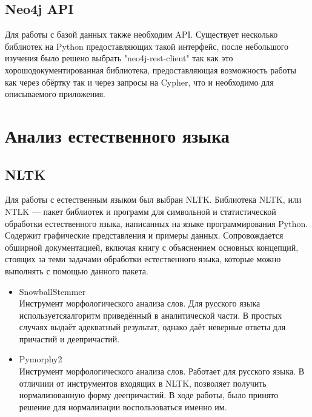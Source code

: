 \subsection {Neo4j API}
Для работы с базой данных также необходим API. Существует несколько библиотек на Python предоставляющих такой интерфейс, после небольшого изучения было решено выбрать "neo4j-rest-client" так как это хорошодокументированная библиотека, предоставляющая возможность работы как через обёртку так и через запросы на Cypher, что и необходимо для описываемого приложения.
\section{Анализ естественного языка}
\subsection{NLTK}
Для работы с естественным языком был выбран NLTK.
Библиотека NLTK, или NTLK — пакет библиотек и программ для символьной и статистической обработки естественного языка, написанных на языке программирования Python. Содержит графические представления и примеры данных. Сопровождается обширной документацией, включая книгу с объяснением основных концепций, стоящих за теми задачами обработки естественного языка, которые можно выполнять с помощью данного пакета.
\begin{itemize}
\item SnowballStemmer\\
Инструмент морфологического анализа слов. Для русского языка используетсяалгоритм приведённый в аналитической части. В простых случаях выдаёт адекватный результат, однако даёт неверные ответы для причастий и деепричастий. 
\item Pymorphy2\\
Инструмент морфологического анализа слов. Работает для русского языка. В отличиии от инструментов входящих в NLTK, позволяет получить нормализованную форму деепричастий. В ходе работы, было принято решение для нормализации воспользоваться именно им. 
\end{itemize}
